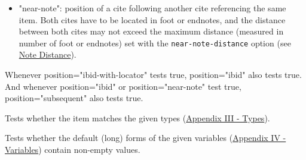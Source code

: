 \begin{description}
\begin{itemize}
  \begin{enumerate}
  \def\labelenumi{\alph{enumi})}
  \tightlist
  \item
    the current cite immediately follows on another cite, within the
    same citation, that references the same item
  \end{enumerate}

  or

  \begin{enumerate}
  \def\labelenumi{\alph{enumi})}
  \setcounter{enumi}{1}
  \tightlist
  \item
    the current cite is the first cite in the citation, and the previous
    citation consists of a single cite referencing the same item
  \end{enumerate}

  If either requirement is met, the presence of locators determines
  which position is assigned:

  \begin{itemize}
  \tightlist
  \item
    \textbf{Preceding cite does not have a locator}: if the current cite
    has a locator, the position of the current cite is
    "ibid-with-locator". Otherwise the position is "ibid".
  \item
    \textbf{Preceding cite does have a locator}: if the current cite has
    the same locator, the position of the current cite is "ibid". If the
    locator differs the position is "ibid-with-locator". If the current
    cite lacks a locator its only position is "subsequent".
  \end{itemize}
\item
  "near-note": position of a cite following another cite referencing the
  same item. Both cites have to be located in foot or endnotes, and the
  distance between both cites may not exceed the maximum distance
  (measured in number of foot or endnotes) set with the
  \texttt{near-note-distance} option (see
  \protect\hyperlink{note-distance}{Note Distance}).
\end{itemize}

Whenever position="ibid-with-locator" tests true, position="ibid" also
tests true. And whenever position="ibid" or position="near-note" test
true, position="subsequent" also tests true.
\item[\texttt{type}]
Tests whether the item matches the given types
(\protect\hyperlink{appendix-iii---types}{Appendix III - Types}).
\item[\texttt{variable}]
Tests whether the default (long) forms of the given variables
(\protect\hyperlink{appendix-iv---variables}{Appendix IV - Variables})
contain non-empty values.
\end{description}

